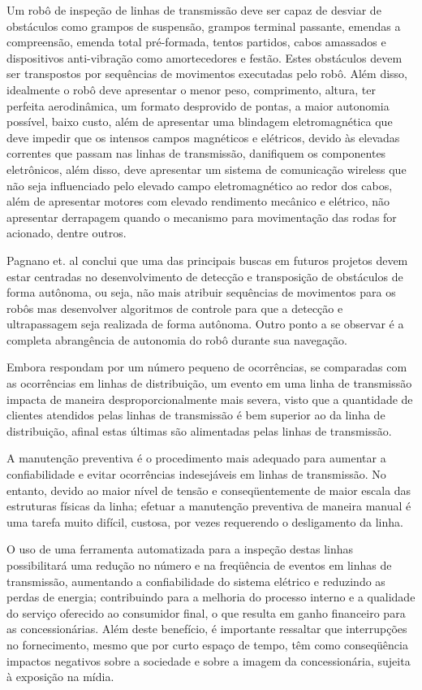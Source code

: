 Um robô de inspeção de linhas de transmissão deve ser capaz de desviar de obstáculos como grampos de suspensão, grampos terminal passante, emendas a compreensão, emenda total pré-formada, tentos partidos, cabos amassados e dispositivos anti-vibração como amortecedores e festão. Estes obstáculos devem ser transpostos por sequências de movimentos executadas pelo robô. Além disso, idealmente o robô deve apresentar o menor peso, comprimento, altura, ter perfeita aerodinâmica, um formato desprovido de pontas, a maior autonomia possível, baixo custo, além de apresentar uma blindagem eletromagnética que deve impedir que os intensos campos magnéticos e elétricos, devido às elevadas correntes que passam nas linhas de transmissão, danifiquem os componentes eletrônicos, além disso, deve apresentar um sistema de comunicação wireless que não seja influenciado pelo elevado campo eletromagnético ao redor dos cabos, além de apresentar motores com elevado rendimento mecânico e elétrico, não apresentar derrapagem quando o mecanismo para movimentação das rodas for acionado, dentre outros.

Pagnano et. al \cite{pagnano2013roadmap} conclui que uma das principais buscas em futuros projetos devem estar centradas no desenvolvimento de detecção e transposição de obstáculos de forma autônoma, ou seja, não mais atribuir sequências de movimentos para os robôs mas desenvolver algoritmos de controle para que a detecção e ultrapassagem seja realizada de forma autônoma. Outro ponto a se observar é a completa abrangência de autonomia do robô durante sua navegação. 
  
Embora respondam por um número pequeno de ocorrências, se comparadas com as ocorrências em linhas de distribuição, um evento em uma linha de transmissão impacta de maneira desproporcionalmente mais severa, visto que a quantidade de clientes atendidos pelas linhas de transmissão é bem superior ao da linha de distribuição, afinal estas últimas são alimentadas pelas linhas de transmissão.

A manutenção preventiva é o procedimento mais adequado para aumentar a confiabilidade e evitar ocorrências indesejáveis em linhas de transmissão. No entanto, devido ao maior nível de tensão e conseqüentemente de maior escala das estruturas físicas da linha; efetuar a manutenção preventiva de maneira manual é uma tarefa muito difícil, custosa, por vezes requerendo o desligamento da linha. 

O uso de uma ferramenta automatizada para a inspeção destas linhas possibilitará uma redução no número e na freqüência de eventos em linhas de transmissão, aumentando a confiabilidade do sistema elétrico e reduzindo as perdas de energia; contribuindo para a melhoria do processo interno e a qualidade do serviço oferecido ao consumidor final, o que resulta em ganho financeiro para as concessionárias. Além deste benefício, é importante ressaltar que interrupções no fornecimento, mesmo que por curto espaço de tempo, têm como conseqüência impactos negativos sobre a sociedade e sobre a imagem da concessionária, sujeita à exposição na mídia.

